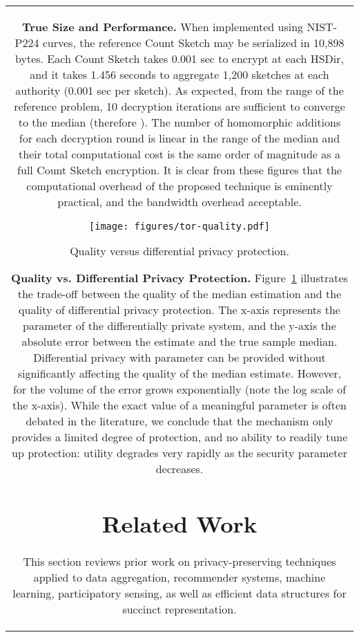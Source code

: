 \documentclass[conference]{IEEEtran}
\newcommand{\descr}[1]{\medskip \noindent \textbf{#1}}
\begin{document}
\begin{figure*}[ht!]
{\begin{tabular}{|c|}
\descr{True Size and Performance.} When implemented using NIST-P224 curves, the reference Count Sketch may be serialized in 10,898 bytes. Each Count Sketch takes 0.001 sec to encrypt at each HSDir, and it takes 1.456 seconds to aggregate 1,200 sketches at each authority (0.001 sec per sketch). As expected, from the range of the reference problem, 10 decryption iterations are sufficient to converge to the median (therefore ). The number of homomorphic additions for each decryption round is linear in the range of the median and their total computational cost is the same order of magnitude as a full Count Sketch encryption. It is clear from these figures that the computational overhead of the proposed technique is eminently practical, and the bandwidth overhead acceptable.

\begin{figure}[t]
\centering
\texttt{[image: figures/tor-quality.pdf]}
\vspace{-0.2cm}
\caption{\label{fig:tor-quality} Quality versus differential privacy protection.}
\vspace{-0.2cm}
\end{figure}

\descr{Quality vs. Differential Privacy Protection.} Figure~\ref{fig:tor-quality} illustrates the trade-off between the quality of the median estimation and the quality of differential privacy protection. The x-axis represents the  parameter of the differentially private system, and the y-axis the absolute error between the estimate and the true sample median. Differential privacy with parameter  can be provided without significantly affecting the quality of the median estimate. However, for  the volume of the error grows exponentially (note the log scale of the x-axis). While the exact value of a 
meaningful  parameter is often debated in the literature, we conclude that the mechanism only provides a limited degree of protection, and no ability to readily tune up protection: utility degrades very rapidly as the security parameter  decreases.

\section{Related Work}
\label{sec:work}
This section reviews prior work on privacy-preserving techniques applied to data aggregation, recommender systems,  machine learning, participatory sensing, as well as efficient data structures for succinct representation. 




\end{tabular}}
\end{figure*}
\end{document}
